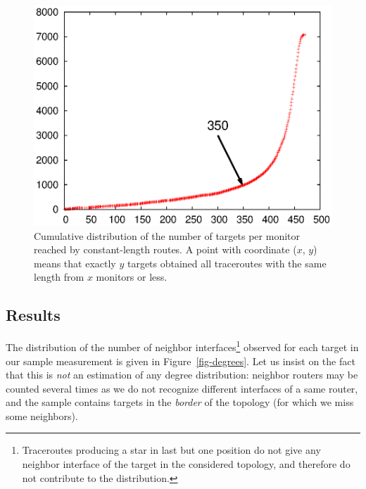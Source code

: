 \documentclass[conference]{IEEEtran}
\begin{document}
\begin{figure}[!ht]
\centering
\includegraphics[scale=.5]{routelength.eps}
\caption{
Cumulative distribution of the number of targets per monitor reached by constant-length routes. A point with coordinate ($x$, $y$) means that exactly $y$ targets obtained all traceroutes with the same length from $x$ monitors or less.
}
\label{fig-routelength}
\end{figure}

\subsection{Results}

The distribution of the number of neighbor interfaces\footnote{Traceroutes producing a star in last but one position do not give any neighbor interface of the target in the considered topology, and therefore do not contribute to the distribution.}
observed for each target in our sample measurement is given in Figure~\ref{fig-degrees}. Let us insist on the fact that this is {\em not} an estimation of any degree distribution: neighbor routers may be counted several times as we do not recognize different interfaces of a same router, and the sample contains targets in the {\em border} of the topology (for which we miss some neighbors).
\end{document}

